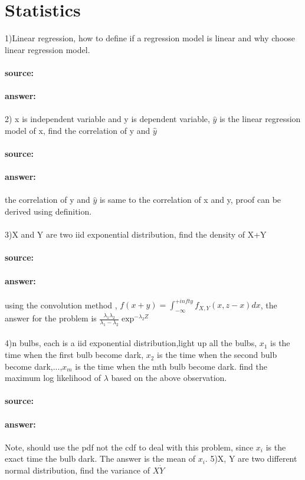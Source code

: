 \documentclass[11pt,fleqn]{book} %
\begin{document}
\section{Statistics}
1)Linear regression, how to define if a regression model is linear and why choose linear regression model.\\\\
\textbf{source:}\\\\
\textbf{answer:}\\\\
2) x is independent variable and y is dependent variable, $\hat{y}$ is the linear regression model of x, find the correlation of y and $\hat{y}$\\\\
\textbf{source:}\\\\
\textbf{answer:}\\\\
the correlation of y and $\hat{y}$ is same to the correlation of x and y, proof can be derived using definition.\\\\
3)X and Y are two iid exponential distribution, find the density of X+Y\\\\
\textbf{source:}\\\\
\textbf{answer:}\\\\
using the convolution method , $f(x+y)=\int_{-\infty}^{+infty}f_{X,Y}(x,z-x)dx$,
the answer for the problem is $\frac{\lambda_1\lambda_2}{\lambda_1-\lambda_2}\exp^{-\lambda_2 Z}$\\\\
4)n bulbs, each is a iid exponential distribution,light up all the bulbs, $x_1$ is the time when the first bulb become dark, $x_2$ is the time when the second bulb become dark,...,$x_m$ is the time when the mth bulb become dark. find the maximum log likelihood of $\lambda$ based on the above observation. \\\\
\textbf{source:}\\\\
\textbf{answer:}\\\\
Note, should use the pdf not the cdf to deal with this problem, since $x_i$ is the exact time the bulb dark. The answer is the mean of $x_i$.
5)X, Y are two different normal distribution, find the variance of $X\dot Y$\\\\
\end{document}
